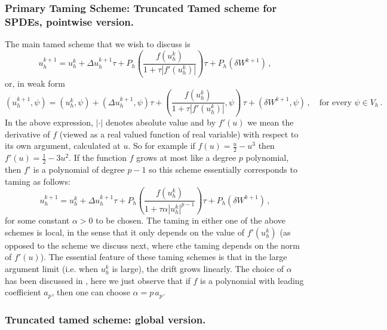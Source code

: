 \documentclass[reqno, 11pt]{amsart}
\theoremstyle{plain}
\theoremstyle{definition}
\theoremstyle{remark}
\numberwithin{equation}{section}
\numberwithin{theorem}{section}
\begin{document}
{\subsubsection{Primary Taming Scheme: Truncated Tamed scheme for SPDEs, pointwise version.}
The main tamed scheme that we wish to discuss is
\begin{equation}\label{scheme:taming by abs val f' pointwise standard form}
u_h^{k+1} = u_h^{k} +  \Delta u_h^{k+1}  \tau +
P_h\left(\frac{f(u_h^{k})}{1+\tau |f'(u_h^k)|}\right) \tau + P_h(\delta W^{k+1}) \,,
\end{equation}
or, in weak form 
\begin{equation}\label{scheme:taming2derivativeabsolute value f'}
(u_h^{k+1}, \psi) = (u_h^{k}, \psi) +  (\Delta u_h^{k+1}, \psi) \tau +
\left(\frac{f(u_h^{k})}{1+\tau |f'(u_h^k)|}, \psi\right)\, \tau + (\delta W^{k+1}, \psi) \,, \quad \mbox{for every } \psi \in V_h\,. 
\end{equation}
In the above expression, $| \cdot |$ denotes absolute value and by $f'(u)$ we mean the derivative of $f$ (viewed as a real valued function of real variable) with respect to its own argument, calculated at $u$.  So for example if $f(u)=\frac u2 - u^3$ then $f'(u)=\frac 12 -3 u^2$. 
If the function $f$ grows at most like a degree $p$ polynomial,  then $f'$ is a polynomial of degree $p-1$ so this scheme essentially corresponds to taming as follows:  
\begin{equation}\label{scheme:taming2derivativeabsolute value}
u_h^{k+1} = u_h^{k} +  \Delta u_h^{k+1} \tau +
P_h \left(\frac{f(u_h^{k})}{1+\tau \alpha |u_h^k|^{p-1}}\right) \tau + P_h (\delta W^{k+1}) \,,  
\end{equation}
for some constant $\alpha>0$ to be chosen. The taming in either one of the above schemes is local, in the sense that it only depends on the value of $f'(u_h^k)$ (as opposed to the scheme we discuss next, where cthe taming depends on the norm of $f'(u)$). The essential feature of these taming schemes is that in the large argument limit (i.e. when $u_h^k$ is large), the drift grows linearly. The choice of $\alpha$ has been discussed in \cite{Angeli}, here we just observe that 
if $f$ is a polynomial with leading coefficient $a_p$, then one can choose $\alpha= p\, a_p$.





\subsubsection{Truncated tamed scheme: global version.}

}
\end{document}
